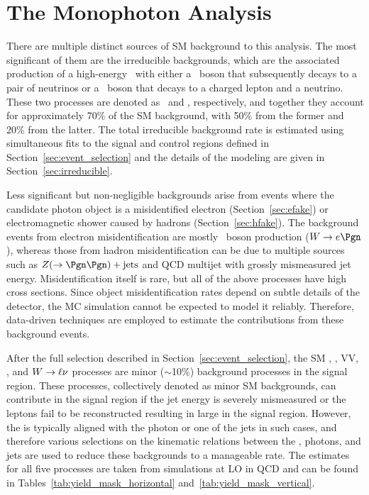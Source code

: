 \chapter{The Monophoton Analysis}
\label{chap:analysis}

There are multiple distinct sources of SM background to this analysis. 
The most significant of them are the irreducible backgrounds, which are the associated production of a high-energy \Pgg\ with either a \PZ\ boson that subsequently decays to a pair of neutrinos or a \PW\ boson that decays to a charged lepton and a neutrino. 
These two processes are denoted as \zinvg\ and \wlng, respectively, and together they account for approximately 70\% of the SM background, with 50\% from the former and 20\% from the latter.
The total irreducible background rate is estimated using simultaneous fits to the signal and control regions defined in Section~\ref{sec:event_selection} and the details of the modeling are given in Section~\ref{sec:irreducible}.

Less significant but non-negligible backgrounds arise from events where the candidate photon object is a misidentified electron (Section~\ref{sec:efake}) or electromagnetic shower caused by hadrons (Section~\ref{sec:hfake}). 
The background events from electron misidentification are mostly \PW\ boson production ($\PW\rightarrow \Pe\Pgn$), whereas those from hadron misidentification can be due to multiple sources such as $\PZ(\rightarrow\Pgn\Pgn)+\text{jets}$ and QCD multijet with grossly mismeasured jet energy. 
Misidentification itself is rare, but all of the above processes have high cross sections. 
Since object misidentification rates depend on subtle details of the detector, the MC simulation cannot be expected to model it reliably. 
Therefore, data-driven techniques are employed to estimate the contributions from these background events.

After the full selection described in Section~\ref{sec:event_selection}, the SM \gj, \ttg, VV\Pgg, \zllg, and ${W}\to\ell\nu$ processes are minor ($\sim$10\%) background processes in the signal region. 
These processes, collectively denoted as minor SM backgrounds, can contribute in the signal region if the jet energy is severely mismeasured or the leptons fail to be reconstructed resulting in large \met in the signal region. 
However, the \met is typically aligned with the photon or one of the jets in such cases, and therefore various selections on the kinematic relations between the \met, photons, and jets are used to reduce these backgrounds to a manageable rate. 
The estimates for all five processes are taken from \MGvATNLO simulations at LO in QCD and can be found in Tables~\ref{tab:yield_mask_horizontal} and~\ref{tab:yield_mask_vertical}.

